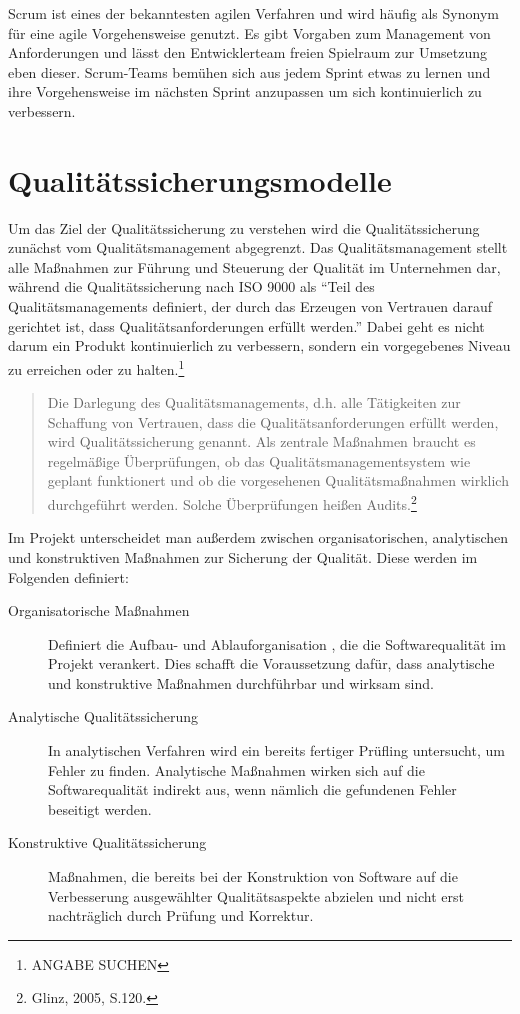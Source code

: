                 Scrum ist eines der bekanntesten agilen Verfahren und wird häufig als Synonym für eine agile Vorgehensweise genutzt. Es gibt Vorgaben zum Management von Anforderungen und lässt den Entwicklerteam freien Spielraum zur Umsetzung eben dieser. Scrum-Teams bemühen sich aus jedem Sprint etwas zu lernen und ihre Vorgehensweise im nächsten Sprint anzupassen um sich kontinuierlich zu verbessern.

%
%
    \section{Qualitätssicherungsmodelle}

        Um das Ziel der Qualitätssicherung zu verstehen wird die Qualitätssicherung zunächst vom Qualitätsmanagement abgegrenzt. Das Qualitätsmanagement stellt alle Maßnahmen zur Führung und Steuerung der Qualität im Unternehmen dar, während die Qualitätssicherung nach ISO 9000 als \enquote{Teil des Qualitätsmanagements definiert, der durch das Erzeugen von Vertrauen darauf gerichtet ist, dass Qualitätsanforderungen erfüllt werden.} Dabei geht es nicht darum ein Produkt kontinuierlich zu verbessern, sondern ein vorgegebenes Niveau zu erreichen oder zu halten.\footnote{ANGABE SUCHEN}

        \begin{quote}
          Die Darlegung des Qualitätsmanagements, d.h. alle Tätigkeiten zur Schaffung von Vertrauen, dass die Qualitätsanforderungen erfüllt werden, wird Qualitätssicherung genannt. Als zentrale Maßnahmen braucht es regelmäßige Überprüfungen, ob das Qualitätsmanagementsystem wie geplant funktionert und ob die vorgesehenen Qualitätsmaßnahmen wirklich durchgeführt werden. Solche Überprüfungen heißen Audits.\footnote{Glinz, 2005, S.120.}
        \end{quote}

        Im Projekt unterscheidet man außerdem zwischen organisatorischen, analytischen und konstruktiven Maßnahmen zur Sicherung der Qualität. Diese werden im Folgenden definiert:

        \begin{description}
          \item[Organisatorische Maßnahmen] Definiert die Aufbau- und Ablauforganisation , die die Softwarequalität im Projekt verankert. Dies schafft die Voraussetzung dafür, dass analytische und konstruktive Maßnahmen durchführbar und wirksam sind.
          \item[Analytische Qualitätssicherung] In analytischen Verfahren wird ein bereits fertiger Prüfling untersucht, um Fehler zu finden. Analytische Maßnahmen wirken sich auf die Softwarequalität indirekt aus, wenn nämlich die gefundenen Fehler beseitigt werden.
          \item[Konstruktive Qualitätssicherung] Maßnahmen, die bereits bei der Konstruktion von Software auf die Verbesserung ausgewählter Qualitätsaspekte abzielen und nicht erst nachträglich durch Prüfung und Korrektur.
        \end{description}

